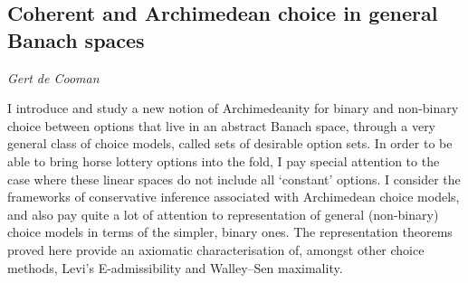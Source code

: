 \documentclass[../booklet.tex]{subfiles}
\begin{document}
\subsection[Coherent and Archimedean choice in general Banach spaces. {\it Gert de Cooman}]{Coherent and Archimedean choice in general Banach spaces}

\begin{center}
  {\it Gert de Cooman}
\end{center}

\vskip 0.8cm


I introduce and study a new notion of Archimedeanity for binary and non-binary choice between options that live in an abstract Banach space, through a very general class of choice models, called sets of desirable option sets.
In order to be able to bring horse lottery options into the fold, I pay special attention to the case where these linear spaces do not include all `constant' options.
I consider the frameworks of conservative inference associated with Archimedean choice models, and also pay quite a lot of attention to representation of general (non-binary) choice models in terms of the simpler, binary ones.
The representation theorems proved here provide an axiomatic characterisation of, amongst other choice methods, Levi's E-admissibility and Walley--Sen maximality.

\end{document}

